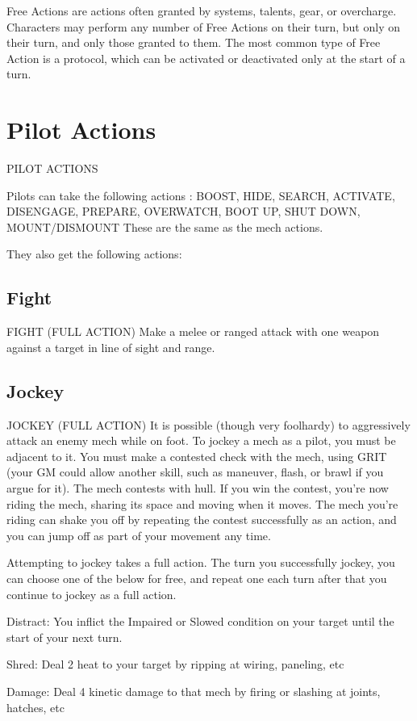 Free Actions are actions often granted by systems, talents, gear, or overcharge. Characters may
perform any number of Free Actions on their turn, but only on their turn, and only those granted
to them. The most common type of Free Action is a protocol, which can be activated or
deactivated only at the start of a turn.

\section{Pilot Actions}
   PILOT ACTIONS

Pilots can take the following actions : BOOST, HIDE, SEARCH, ACTIVATE, DISENGAGE,
PREPARE, OVERWATCH, BOOT UP, SHUT DOWN, MOUNT/DISMOUNT
These are the same as the mech actions.


They also get the following actions:

\subsection{Fight}
                                      FIGHT (FULL ACTION)
Make a melee or ranged attack with one weapon against a target in line of sight and range.

\subsection{Jockey}

                                    JOCKEY (FULL ACTION)
It is possible (though very foolhardy) to aggressively attack an enemy mech while on foot. To
jockey a mech as a pilot, you must be adjacent to it. You must make a contested check with the
mech, using GRIT (your GM could allow another skill, such as maneuver, flash, or brawl if you
argue for it). The mech contests with hull. If you win the contest, you’re now riding the mech,
sharing its space and moving when it moves. The mech you’re riding can shake you off by
repeating the contest successfully as an action, and you can jump off as part of your movement
any time.


Attempting to jockey takes a full action. The turn you successfully jockey, you can choose one of
the below for free, and repeat one each turn after that you continue to jockey as a full action.


Distract: You inflict the Impaired or Slowed condition on your target until the start of your next
turn.

Shred: Deal 2 heat to your target by ripping at wiring, paneling, etc

Damage: Deal 4 kinetic damage to that mech by firing or slashing at joints, hatches, etc


